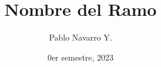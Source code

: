 \documentclass{apuntes}
\title{Nombre del Ramo}
\author{Pablo Navarro Y.}
\date{0er semestre, 2023}
\begin{document}
\renewcommand{\onlyinsubfile}[1]{}
\renewcommand{\notinsubfile}[1]{#1}

\maketitle
\begin{definicion}

\end{definicion}

\begin{prop}

\end{prop}

\begin{teorema}

\end{teorema}

\begin{corolario}

\end{corolario}

\begin{lema}

\end{lema}

\begin{aff}

\end{aff}

\begin{dem}

\end{dem}

\begin{sol}

\end{sol}

\begin{ejemplo}

\end{ejemplo}

\begin{ejercicio}

\end{ejercicio}

\begin{pregunta}

\end{pregunta}

\begin{obs}

\end{obs}

\begin{notacion}

\end{notacion}
\end{document}
